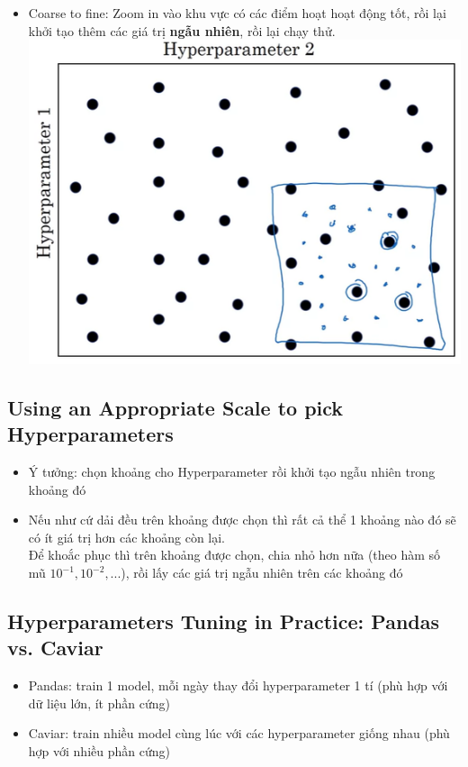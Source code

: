 \documentclass[12pt,a4paper]{report}
\begin{document}
\begin{itemize}
				\item Coarse to fine: Zoom in vào khu vực có các điểm hoạt hoạt động tốt, rồi lại khởi tạo thêm các giá trị \textbf{ngẫu nhiên}, rồi lại chạy 
					thử.\\\includegraphics[scale=0.5]{8}
			\end{itemize}
		\subsection{Using an Appropriate Scale to pick Hyperparameters}
			\begin{itemize}
				\item Ý tưởng: chọn khoảng cho Hyperparameter rồi khởi tạo ngẫu nhiên trong khoảng đó
				\item Nếu như cứ dải đều trên khoảng được chọn thì rất cả thể 1 khoảng nào đó sẽ có ít giá trị hơn các khoảng còn lại.\\
					Để khoắc phục thì trên khoảng được chọn, chia nhỏ hơn nữa (theo hàm số mũ $ 10^{-1}, 10^{-2}, ... $), rồi lấy các giá trị ngẫu nhiên trên các khoảng đó
			\end{itemize}
		\subsection{Hyperparameters Tuning in Practice: Pandas vs. Caviar}
			\begin{itemize}
				\item Pandas: train 1 model, mỗi ngày thay đổi hyperparameter 1 tí (phù hợp với dữ liệu lớn, ít phần cứng)
				\item Caviar: train nhiều model cùng lúc với các hyperparameter giống nhau (phù hợp với nhiều phần cứng)
			\end{itemize}
\end{document}
